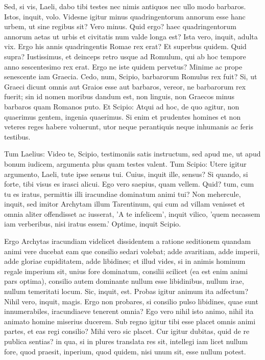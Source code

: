  Sed, si vis, Laeli, dabo tibi testes nec nimis antiquos nec ullo modo barbaros. Istos, inquit, volo. Videsne igitur minus quadringentorum annorum esse hanc urbem, ut sine regibus sit? Vero minus. Quid ergo? haec quadringentorum annorum aetas ut urbis et civitatis num valde longa est? Ista vero, inquit, adulta vix. Ergo his annis quadringentis Romae rex erat? Et superbus quidem. Quid supra? Iustissimus, et deinceps retro usque ad Romulum, qui ab hoc tempore anno sescentesimo rex erat. Ergo ne iste quidem pervetus? Minime ac prope senescente iam Graecia. Cedo, num, Scipio, barbarorum Romulus rex fuit? Si, ut Graeci dicunt omnis aut Graios esse aut barbaros, vereor, ne barbarorum rex fuerit; sin id nomen moribus dandum est, non linguis, non Graecos minus barbaros quam Romanos puto. Et Scipio: Atqui ad hoc, de quo agitur, non quaerimus gentem, ingenia quaerimus. Si enim et prudentes homines et non veteres reges habere voluerunt, utor neque perantiquis neque inhumanis ac feris testibus.

 Tum Laelius: Video te, Scipio, testimoniis satis instructum, sed apud me, ut apud bonum iudicem, argumenta plus quam testes valent. Tum Scipio: Utere igitur argumento, Laeli, tute ipse sensus tui. Cuius, inquit ille, sensus? Si quando, si forte, tibi visus es irasci alicui. Ego vero saepius, quam vellem. Quid? tum, cum tu es iratus, permittis illi iracundiae dominatum animi tui? Non mehercule, inquit, sed imitor Archytam illum Tarentinum, qui cum ad villam venisset et omnia aliter offendisset ac iusserat, 'A te infelicem', inquit vilico, 'quem necassem iam verberibus, nisi iratus essem.' Optime, inquit Scipio.

 Ergo Archytas iracundiam videlicet dissidentem a ratione seditionem quandam animi vere ducebat eam que consilio sedari volebat; adde avaritiam, adde imperii, adde gloriae cupiditatem, adde libidines; et illud vides, si in animis hominum regale imperium sit, unius fore dominatum, consilii scilicet (ea est enim animi pars optima), consilio autem dominante nullum esse libidinibus, nullum irae, nullum temeritati locum. Sic, inquit, est. Probas igitur animum ita adfectum? Nihil vero, inquit, magis. Ergo non probares, si consilio pulso libidines, quae sunt innumerabiles, iracundiaeve tenerent omnia? Ego vero nihil isto animo, nihil ita animato homine miserius ducerem. Sub regno igitur tibi esse placet omnis animi partes, et eas regi consilio? Mihi vero sic placet. Cur igitur dubitas, quid de re publica sentias? in qua, si in plures translata res sit, intellegi iam licet nullum fore, quod praesit, inperium, quod quidem, nisi unum sit, esse nullum potest.

